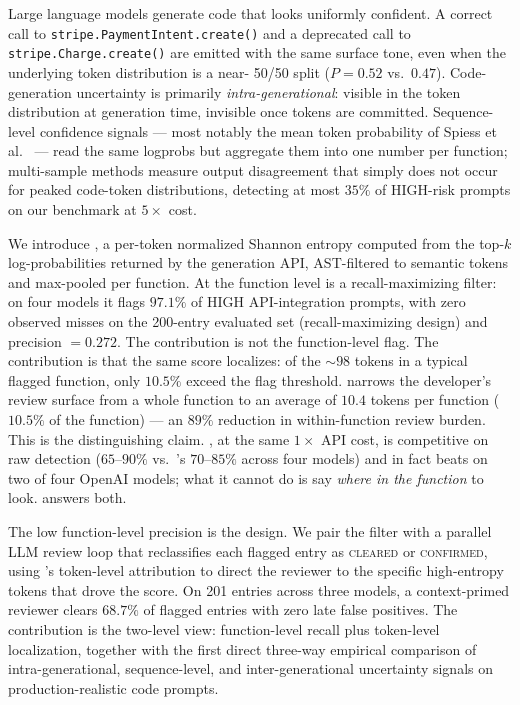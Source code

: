 Large language models generate code that looks uniformly confident. A
correct call to \texttt{stripe.PaymentIntent.create()} and a deprecated
call to \texttt{stripe.Charge.create()} are emitted with the same
surface tone, even when the underlying token distribution is a near-%
50/50 split ($P=0.52$ vs.\ $0.47$). Code-generation uncertainty is
primarily \emph{intra-generational}: visible in the token distribution
at generation time, invisible once tokens are committed. Sequence-level
confidence signals --- most notably the mean token probability \papg
of Spiess et al.~\cite{spiess2025calibration} --- read the same
logprobs but aggregate them into one number per function; multi-sample
methods measure output disagreement that simply does not occur for
peaked code-token distributions, detecting at most $35\%$ of HIGH-risk
prompts on our benchmark at $5\times$ cost.

We introduce \eps, a per-token normalized Shannon entropy computed from
the top-$k$ log-probabilities returned by the generation API,
AST-filtered to semantic tokens and max-pooled per function. At the
function level \eps is a recall-maximizing filter: on four models it
flags $97.1\%$ of HIGH API-integration prompts, with zero observed misses on the 200-entry evaluated set (recall-maximizing design) and
precision $=0.272$. The contribution is
not the function-level flag. The contribution is that the same score
localizes: of the $\sim 98$ tokens in a typical flagged function, only
$10.5\%$ exceed the flag threshold. \eps narrows the developer's
review surface from a whole function to an average of $10.4$ tokens
per function ($10.5\%$ of the function) --- an $89\%$ reduction in
within-function review burden. This is the distinguishing claim.
\papg, at the same $1\times$ API cost, is competitive on raw detection
($65$--$90\%$ vs.\ \eps's $70$--$85\%$ across four models) and in fact
beats \eps on two of four OpenAI models; what it cannot do is say
\emph{where in the function} to look. \eps answers both.

The low function-level precision is the design. We pair the filter
with a parallel LLM review loop that reclassifies each flagged entry
as \textsc{cleared} or \textsc{confirmed}, using \eps's token-level
attribution to direct the reviewer to the specific high-entropy
tokens that drove the score. On 201 entries across three models, a
context-primed reviewer clears $68.7\%$ of flagged entries with zero
late false positives. The contribution is the two-level view:
function-level recall plus token-level localization, together with
the first direct three-way empirical comparison of intra-generational,
sequence-level, and inter-generational uncertainty signals on
production-realistic code prompts.
